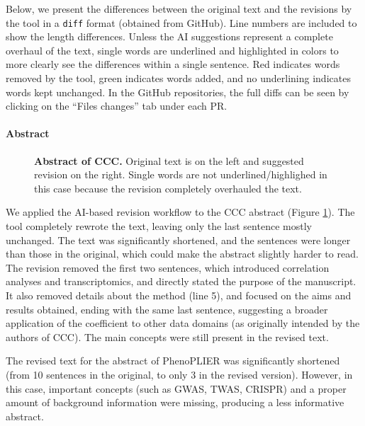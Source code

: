 \documentclass[
]{article}
\begin{document}
Below, we present the differences between the original text and the revisions by the tool in a \texttt{diff} format (obtained from GitHub).
Line numbers are included to show the length differences.
Unless the AI suggestions represent a complete overhaul of the text, single words are underlined and highlighted in colors to more clearly see the differences within a single sentence.
Red indicates words removed by the tool, green indicates words added, and no underlining indicates words kept unchanged.
In the GitHub repositories, the full diffs can be seen by clicking on the ``Files changes'' tab under each PR.

\hypertarget{abstract-1}{%
\paragraph{Abstract}\label{abstract-1}}

\begin{figure}
\hypertarget{fig:abstract:ccc}{%
\centering

\caption{\textbf{Abstract of CCC.}
Original text is on the left and suggested revision on the right.
Single words are not underlined/highlighed in this case because the revision completely overhauled the text.}\label{fig:abstract:ccc}
}
\end{figure}

We applied the AI-based revision workflow to the CCC abstract (Figure \ref{fig:abstract:ccc}).
The tool completely rewrote the text, leaving only the last sentence mostly unchanged.
The text was significantly shortened, and the sentences were longer than those in the original, which could make the abstract slightly harder to read.
The revision removed the first two sentences, which introduced correlation analyses and transcriptomics, and directly stated the purpose of the manuscript.
It also removed details about the method (line 5), and focused on the aims and results obtained, ending with the same last sentence, suggesting a broader application of the coefficient to other data domains (as originally intended by the authors of CCC).
The main concepts were still present in the revised text.

The revised text for the abstract of PhenoPLIER was significantly shortened (from 10 sentences in the original, to only 3 in the revised version).
However, in this case, important concepts (such as GWAS, TWAS, CRISPR) and a proper amount of background information were missing, producing a less informative abstract.
\end{document}
